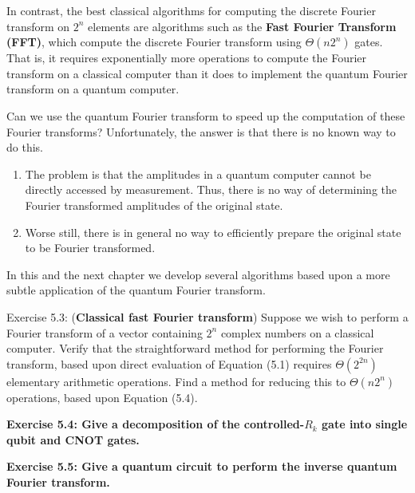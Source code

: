 In contrast, the best classical algorithms for computing the discrete Fourier transform on $2^{n}$ elements are algorithms such as the \textbf{Fast Fourier Transform (FFT)}, which compute the discrete Fourier transform using $\Theta\left(n 2^{n}\right)$ gates. That is, it requires exponentially more operations to compute the Fourier transform on a classical computer than it does to implement the quantum Fourier transform on a quantum computer.

Can we use the quantum Fourier transform to speed up the computation of these Fourier transforms? Unfortunately, the answer is that there is no known way to do this. 

\begin{enumerate}
    \item The problem is that the amplitudes in a quantum computer cannot be directly accessed by measurement. Thus, there is no way of determining the Fourier transformed amplitudes of the original state.
    \item Worse still, there is in general no way to efficiently prepare the original state to be Fourier transformed.
\end{enumerate}

In this and the next chapter we develop several algorithms based upon a more subtle application of the quantum Fourier transform.

\begin{exercise}
Exercise 5.3: (\textbf{Classical fast Fourier transform}) Suppose we wish to perform a Fourier transform of a vector containing $2^{n}$ complex numbers on a classical computer. Verify that the straightforward method for performing the Fourier transform, based upon direct evaluation of Equation (5.1) requires $\Theta\left(2^{2 n}\right)$ elementary arithmetic operations. Find a method for reducing this to $\Theta\left(n 2^{n}\right)$ operations, based upon Equation (5.4).
\end{exercise}

\begin{exercise}
\textbf{Exercise 5.4: Give a decomposition of the controlled-$R_{k}$ gate into single qubit and CNOT gates.}
\end{exercise}

\begin{exercise}
\textbf{Exercise 5.5: Give a quantum circuit to perform the inverse quantum Fourier transform.}
\end{exercise}

